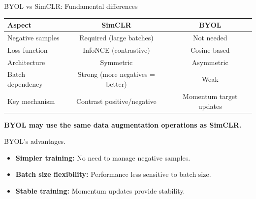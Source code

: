 \documentclass{beamer}
\begin{document}
\begin{frame}{BYOL vs SimCLR: Fundamental differences}
\begin{center}
{\tiny
  \begin{tabular}{|l|c|c|}
\hline
\textbf{Aspect} & \textbf{SimCLR} & \textbf{BYOL} \\
\hline
\alert{Negative samples} & Required (large batches) & Not needed \\
\hline
\alert{Loss function} & InfoNCE (contrastive) & Cosine-based \\
\hline
\alert{Architecture} & Symmetric & Asymmetric \\
\hline
\alert{Batch dependency} & Strong (more negatives = better) & Weak \\
\hline
\alert{Key mechanism} & Contrast positive/negative & Momentum target updates \\
\hline
  \end{tabular}
}
\end{center}
\textbf{BYOL may use the same data augmentation operations as SimCLR.}

\vspace{0.5cm}\pause
\begin{alertblock}{\alert{BYOL's advantages.}}
\begin{itemize}
\item \textbf{Simpler training:} No need to manage negative samples.
\vspace{0.3cm}
\item \textbf{Batch size flexibility:} Performance less sensitive to batch size.
\vspace{0.3cm}
\item \textbf{Stable training:} Momentum updates provide stability.
\end{itemize}
\end{alertblock}
\end{frame}
\end{document}
